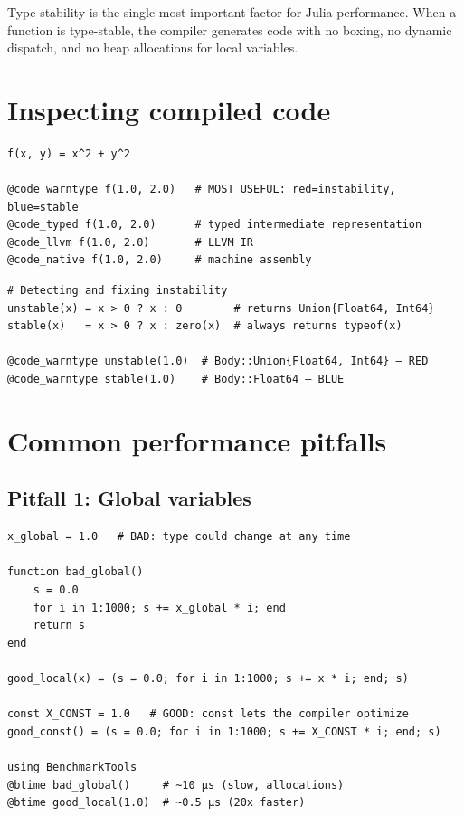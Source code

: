 \begin{performancetip}
Type stability is the single most important factor for Julia performance. When a function is type-stable, the compiler generates code with no boxing, no dynamic dispatch, and no heap allocations for local variables.
\end{performancetip}

\section{Inspecting compiled code}

\begin{verbatim}
f(x, y) = x^2 + y^2

@code_warntype f(1.0, 2.0)   # MOST USEFUL: red=instability, blue=stable
@code_typed f(1.0, 2.0)      # typed intermediate representation
@code_llvm f(1.0, 2.0)       # LLVM IR
@code_native f(1.0, 2.0)     # machine assembly
\end{verbatim}

\begin{verbatim}
# Detecting and fixing instability
unstable(x) = x > 0 ? x : 0        # returns Union{Float64, Int64}
stable(x)   = x > 0 ? x : zero(x)  # always returns typeof(x)

@code_warntype unstable(1.0)  # Body::Union{Float64, Int64} — RED
@code_warntype stable(1.0)    # Body::Float64 — BLUE
\end{verbatim}

\section{Common performance pitfalls}

\subsection{Pitfall 1: Global variables}

\begin{verbatim}
x_global = 1.0   # BAD: type could change at any time

function bad_global()
    s = 0.0
    for i in 1:1000; s += x_global * i; end
    return s
end

good_local(x) = (s = 0.0; for i in 1:1000; s += x * i; end; s)

const X_CONST = 1.0   # GOOD: const lets the compiler optimize
good_const() = (s = 0.0; for i in 1:1000; s += X_CONST * i; end; s)

using BenchmarkTools
@btime bad_global()     # ~10 μs (slow, allocations)
@btime good_local(1.0)  # ~0.5 μs (20x faster)
\end{verbatim}

